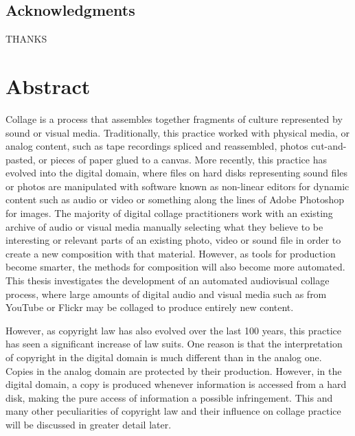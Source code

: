\documentclass[a4paper,11pt,twoside]{ThesisStyle}
\begin{document}

\dominitoc
{}
 \cleardoublepage
\section*{Acknowledgments}
THANKS

\tableofcontents
\mainmatter

\cleardoublepage
\chapter*{Abstract}
Collage is a process that assembles together fragments of culture represented by sound or visual media.  Traditionally, this practice worked with physical media, or analog content, such as tape recordings spliced and reassembled, photos cut-and-pasted, or pieces of paper glued to a canvas.  More recently, this practice has evolved into the digital domain, where files on hard disks representing sound files or photos are manipulated with software known as non-linear editors for dynamic content such as audio or video or something along the lines of Adobe Photoshop\textsuperscript{\textregistered} for images.  The majority of digital collage practitioners work with an existing archive of audio or visual media manually selecting what they believe to be interesting or relevant parts of an existing photo, video or sound file in order to create a new composition with that material.  However, as tools for production become smarter, the methods for composition will also become more automated.  This thesis investigates the development of an automated audiovisual collage process, where large amounts of digital audio and visual media such as from YouTube or Flickr may be collaged to produce entirely new content.

However, as copyright law has also evolved over the last 100 years, this practice has seen a significant increase of law suits.  One reason is that the interpretation of copyright in the digital domain is much different than in the analog one.  Copies in the analog domain are protected by their production.  However, in the digital domain, a copy is produced whenever information is accessed from a hard disk, making the pure access of information a possible infringement.  This and many other peculiarities of copyright law and their influence on collage practice will be discussed in greater detail later.  
\end{document}

